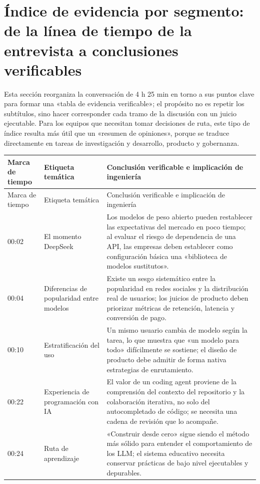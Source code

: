 \section{Índice de evidencia por segmento: de la línea de tiempo de la entrevista a conclusiones verificables}

Esta sección reorganiza la conversación de 4 h 25 min en torno a sus puntos clave para formar una «tabla de evidencia verificable»; el propósito no es repetir los subtítulos, sino hacer corresponder cada tramo de la discusión con un juicio ejecutable. Para los equipos que necesitan tomar decisiones de ruta, este tipo de índice resulta más útil que un «resumen de opiniones», porque se traduce directamente en tareas de investigación y desarrollo, producto y gobernanza.

\begin{longtable}{p{}p{}p{}}
\toprule
Marca de tiempo & Etiqueta temática & Conclusión verificable e implicación de ingeniería \\
\midrule
\endfirsthead
\toprule
Marca de tiempo & Etiqueta temática & Conclusión verificable e implicación de ingeniería \\
\midrule
\endhead
00:02 & El momento DeepSeek & Los modelos de peso abierto pueden restablecer las expectativas del mercado en poco tiempo; al evaluar el riesgo de dependencia de una API, las empresas deben establecer como configuración básica una «biblioteca de modelos sustitutos». \\
00:04 & Diferencias de popularidad entre modelos & Existe un sesgo sistemático entre la popularidad en redes sociales y la distribución real de usuarios; los juicios de producto deben priorizar métricas de retención, latencia y conversión de pago. \\
00:10 & Estratificación del uso & Un mismo usuario cambia de modelo según la tarea, lo que muestra que «un modelo para todo» difícilmente se sostiene; el diseño de producto debe admitir de forma nativa estrategias de enrutamiento. \\
00:22 & Experiencia de programación con IA & El valor de un coding agent proviene de la comprensión del contexto del repositorio y la colaboración iterativa, no solo del autocompletado de código; se necesita una cadena de revisión que lo acompañe. \\
00:24 & Ruta de aprendizaje & «Construir desde cero» sigue siendo el método más sólido para entender el comportamiento de los LLM; el sistema educativo necesita conservar prácticas de bajo nivel ejecutables y depurables. \\

\end{longtable}
